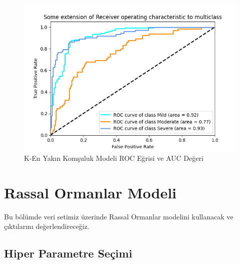 \documentclass[12pt,twoside]{deuthesis}
\begin{document}
\begin{figure}

{\centering \includegraphics[width=1.05\linewidth,height=0.6\textheight]{figure/roc_curve_KNeighborsClassifier} 

}

\caption{K-En Yakın Komşuluk Modeli ROC Eğrisi ve AUC Değeri}\label{fig:unnamed-chunk-19}
\end{figure}
\hypertarget{rassal-ormanlar-modeli}{%
\section{Rassal Ormanlar Modeli}\label{rassal-ormanlar-modeli}}

Bu bölümde veri setimiz üzerinde Rassal Ormanlar modelini kullanacak ve çıktılarını değerlendireceğiz.

\hypertarget{hiper-parametre-seuxe7imi-1}{%
\subsection{Hiper Parametre Seçimi}\label{hiper-parametre-seuxe7imi-1}}
\end{document}
